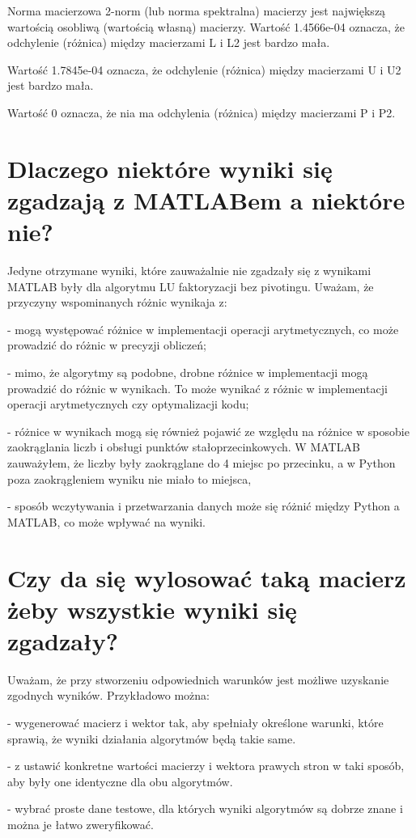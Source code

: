 \documentclass[9pt]{article}
\begin{document}
Norma macierzowa 2-norm (lub norma spektralna) macierzy jest największą wartością osobliwą (wartością własną) macierzy. Wartość 1.4566e-04 oznacza, że odchylenie (różnica) między macierzami L i L2 jest bardzo mała.

Wartość 1.7845e-04 oznacza, że odchylenie (różnica) między macierzami U i U2 jest bardzo mała.

Wartość 0 oznacza, że nia ma odchylenia (różnica) między macierzami P i P2.

\section{Dlaczego niektóre wyniki się zgadzają z MATLABem a niektóre nie?}

Jedyne otrzymane wyniki, które zauważalnie nie zgadzały się z wynikami MATLAB były dla algorytmu LU faktoryzacji bez pivotingu. Uważam, że przyczyny wspominanych różnic wynikaja z:

 - mogą występować różnice w implementacji operacji arytmetycznych, co może prowadzić do różnic w precyzji obliczeń;

- mimo, że algorytmy są podobne, drobne różnice w implementacji mogą prowadzić do różnic w wynikach. To może wynikać z różnic w implementacji operacji arytmetycznych czy optymalizacji kodu;

- różnice w wynikach mogą się również pojawić ze względu na różnice w sposobie zaokrąglania liczb i obsługi punktów stałoprzecinkowych. W MATLAB zauważyłem, że liczby były zaokrąglane do 4 miejsc po przecinku, a w Python poza zaokrągleniem wyniku nie miało to miejsca,

- sposób wczytywania i przetwarzania danych może się różnić między Python a MATLAB, co może wpływać na wyniki.

\section{Czy da się wylosować taką macierz żeby wszystkie wyniki się zgadzały?}

Uważam, że przy stworzeniu odpowiednich warunków jest możliwe uzyskanie zgodnych wyników. Przykładowo można:

 - wygenerować macierz i wektor tak, aby spełniały określone warunki, które sprawią, że wyniki działania algorytmów będą takie same.

- z ustawić konkretne wartości macierzy i wektora prawych stron w taki sposób, aby były one identyczne dla obu algorytmów.

- wybrać proste dane testowe, dla których wyniki algorytmów są dobrze znane i można je łatwo zweryfikować.
\end{document}
